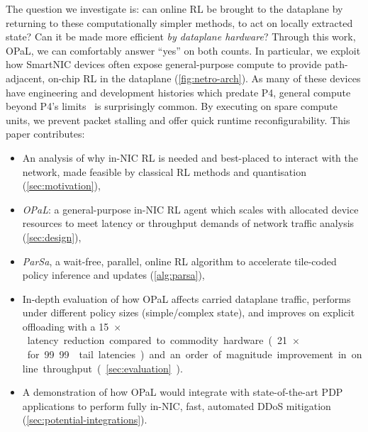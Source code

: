 \documentclass[
sigconf,natbib=false
]{acmart}
\newcommand{\approachshort}{OPaL}
\begin{document}







The question we investigate is: can online RL be brought to the dataplane by returning to these computationally simpler methods, to act on locally extracted state?
Can it be made more efficient \emph{by dataplane hardware}?
Through this work, \approachshort{}, we can comfortably answer ``yes'' on both counts.
In particular, we exploit how SmartNIC devices often expose general-purpose compute to provide path-adjacent, on-chip RL in the dataplane (\cref{fig:netro-arch}).
As many of these devices have engineering and development histories which predate P4, general compute beyond P4's limits~\parencite{p4-psa} is surprisingly common.
By executing on spare compute units, we prevent packet stalling and offer quick runtime reconfigurability.
This paper contributes:
\begin{itemize}
	\item An analysis of why in-NIC RL is needed and best-placed to interact with the network, made feasible by classical RL methods and quantisation (\cref{sec:motivation}),
	\item \emph{\approachshort{}}: a general-purpose in-NIC RL agent which scales with allocated device resources to meet latency or throughput demands of network traffic analysis (\cref{sec:design}),
	\item \emph{ParSa}, a wait-free, parallel, online RL algorithm to accelerate tile-coded policy inference and updates (\cref{alg:parsa}),
	\item In-depth evaluation of how \approachshort{} affects carried dataplane traffic, performs under different policy sizes (simple/complex state), and improves on explicit offloading with a \SI{15}{$\times$} latency reduction compared to commodity hardware (\SI{21}{$\times$} for 99.99 tail latencies) and an order of magnitude improvement in online throughput (\cref{sec:evaluation}).
	\item A demonstration of how \approachshort{} would integrate with state-of-the-art PDP applications to perform fully in-NIC, fast, automated DDoS mitigation (\cref{sec:potential-integrations}).
\end{itemize}
\end{document}
